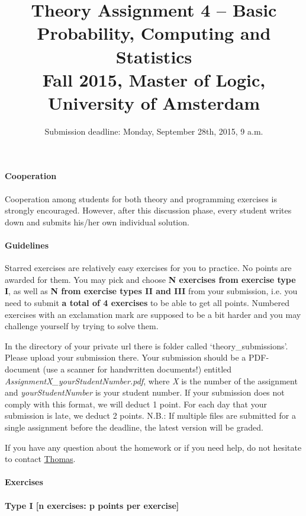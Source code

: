 \documentclass{article}
\title{Theory Assignment 4 -- Basic Probability, Computing and Statistics\\[2mm]
\large{Fall 2015, Master of Logic, University of Amsterdam}}
\author{}
\date{Submission deadline: Monday, September 28th, 2015, 9 a.m.}
\begin{document}
\maketitle

\paragraph{Cooperation}
Cooperation among students for both theory and programming exercises
is strongly encouraged.  However, after this discussion phase, every student writes down and submits his/her own individual solution.

\paragraph{Guidelines}
Starred exercises are relatively easy exercises for you to practice. No points are awarded for them. You may pick and choose {\bf N exercises from exercise type I}, as well as {\bf N from exercise types II and III} from  your submission, i.e. you need to submit {\bf a total of 4 exercises} to be able to get all points. Numbered exercises with an exclamation mark are supposed to be a bit harder and you may challenge yourself by trying to solve them.

In the directory of your private url there is folder called `theory\_submissions'. Please upload your submission there. Your submission should be a PDF-document (use a scanner for handwritten documents!) entitled \textit{AssignmentX\_yourStudentNumber.pdf}, where \textit{X} is the number of the assignment and \textit{yourStudentNumber} is your student number. If your submission does not comply with this format, we will deduct 1 point. For each day that your submission is late, we deduct 2 points. N.B.: If multiple files are submitted for a single assignment before the deadline, the latest version will be graded.

If you have any question about the homework or if you need help, do not hesitate to contact \href{mailto:T.S.Brochhagen@uva.nl}{Thomas}.

\paragraph{Exercises}

\paragraph{Type I [n exercises: p points per exercise]}
\end{document}
